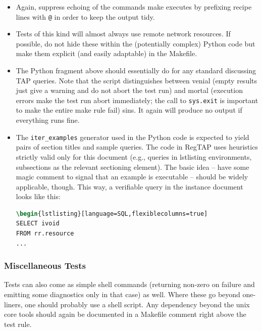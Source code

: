 \documentclass[11pt,a4paper]{ivoa}
\begin{document}
\begin{itemize}
\item Again, suppress echoing of the commands make executes by prefixing recipe
lines with \verb|@| in order to keep the output tidy.

\item Tests of this kind will almost always use remote network
resources.  If possible, do not hide these within the (potentially
complex) Python code but make them explicit (and easily adaptable) in
the Makefile.

\item The Python fragment above should essentially do for any standard
discussing TAP queries. Note that the script distinguishes between
venial (empty results just give a warning and do not abort the
test run) and mortal (execution errors make the test run abort
immediately; the call to \verb|sys.exit| is important to make the entire
make rule fail) sins. It again will produce no output if everything runs
fine.

\item The \verb|iter_examples| generator used in the Python code is expected
to yield pairs of section titles and sample queries.  The code in RegTAP
uses heuristics strictly valid only for this document (e.g., queries in
lstlisting environments, subsections as the relevant sectioning
element).  The basic idea -- have some magic comment to signal that an
example is executable -- should be widely applicable, though.
This way, a verifiable query in the instance document looks like
this:
\begin{lstlisting}[language=tex,basicstyle=\footnotesize]
%CHECK_HERE
\begin{lstlisting}[language=SQL,flexiblecolumns=true]
SELECT ivoid
FROM rr.resource
...
\end{lstlisting}

\end{itemize}

\subsubsection{Miscellaneous Tests}

Tests can also come as simple shell commands (returning non-zero on
failure and emitting some diagnostics only in that case) as well.  Where
these go beyond one-liners, one should probably use a shell script.
Any dependency beyond the unix core tools should again be documented in
a Makefile comment right above the test rule.
\end{document}
